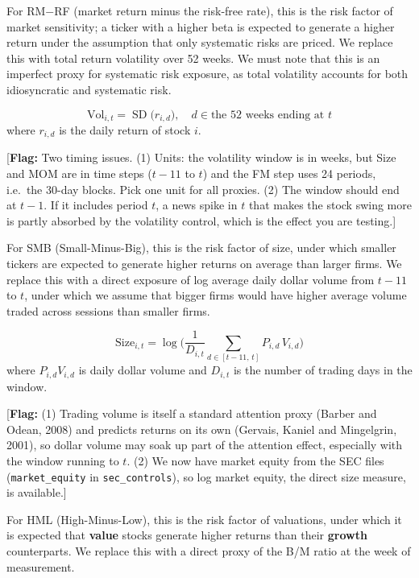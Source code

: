 \documentclass[11pt]{article}
\newcommand{\flag}[1]{{\color{red!75!black}\small [\textbf{Flag:} #1]}}
\begin{document}
For RM$-$RF (market return minus the risk-free rate), this is the risk factor of market sensitivity; a ticker with a higher beta is expected to generate a higher return under the assumption that only systematic risks are priced. We replace this with total return volatility over 52 weeks. We must note that this is an imperfect proxy for systematic risk exposure, as total volatility accounts for both idiosyncratic and systematic risk.

\begin{equation}
\text{Vol}_{i,t} = \operatorname{SD}\big(r_{i,d}\big), \quad d \in \text{the 52 weeks ending at } t
\end{equation}
where $r_{i,d}$ is the daily return of stock $i$.

\flag{Two timing issues. (1) Units: the volatility window is in weeks, but Size and MOM are in time steps ($t-11$ to $t$) and the FM step uses 24 periods, i.e.\ the 30-day blocks. Pick one unit for all proxies. (2) The window should end at $t-1$. If it includes period $t$, a news spike in $t$ that makes the stock swing more is partly absorbed by the volatility control, which is the effect you are testing.}

For SMB (Small-Minus-Big), this is the risk factor of size, under which smaller tickers are expected to generate higher returns on average than larger firms. We replace this with a direct exposure of log average daily dollar volume from $t-11$ to $t$, under which we assume that bigger firms would have higher average volume traded across sessions than smaller firms.

\begin{equation}
\text{Size}_{i,t} = \log\!\Big(\frac{1}{D_{i,t}}\sum_{d \in [t-11,\,t]} P_{i,d}\,V_{i,d}\Big)
\end{equation}
where $P_{i,d}V_{i,d}$ is daily dollar volume and $D_{i,t}$ is the number of trading days in the window.

\flag{(1) Trading volume is itself a standard attention proxy (Barber and Odean, 2008) and predicts returns on its own (Gervais, Kaniel and Mingelgrin, 2001), so dollar volume may soak up part of the attention effect, especially with the window running to $t$. (2) We now have market equity from the SEC files (\texttt{market\_equity} in \texttt{sec\_controls}), so log market equity, the direct size measure, is available.}

For HML (High-Minus-Low), this is the risk factor of valuations, under which it is expected that \textbf{value} stocks generate higher returns than their \textbf{growth} counterparts. We replace this with a direct proxy of the B/M ratio at the week of measurement.
\end{document}
